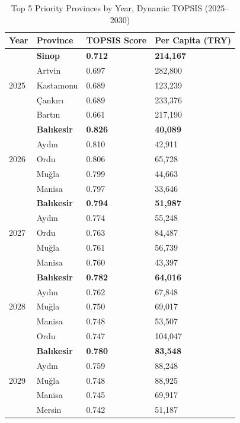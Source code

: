 \documentclass[final, 9pt, twocolumn]{saucis}
\begin{document}
\begin{table}[ht]
\centering
\caption{Top 5 Priority Provinces by Year, Dynamic TOPSIS (2025--2030)}
\label{tab:topsis_top5}
\small
\begin{threeparttable}
\begin{tabular}{p{0.6cm} p{1.5cm} p{1.7cm} p{2.2cm}}
\hline
\textbf{Year} & \textbf{Province} & \textbf{TOPSIS Score} & \textbf{Per Capita (TRY)} \\
\hline
\multirow{5}{*}{2025}
 & \textbf{Sinop} & \textbf{0.712} & \textbf{214{,}167} \\
 & Artvin    & 0.697 & 282{,}800 \\
 & Kastamonu & 0.689 & 123{,}239 \\
 & Çankırı   & 0.689 & 233{,}376 \\
 & Bartın    & 0.661 & 217{,}190 \\
\hline
\multirow{5}{*}{2026}
 & \textbf{Balıkesir} & \textbf{0.826} & \textbf{40{,}089} \\
 & Aydın     & 0.810 & 42{,}911 \\
 & Ordu      & 0.806 & 65{,}728 \\
 & Muğla     & 0.799 & 44{,}663 \\
 & Manisa    & 0.797 & 33{,}646 \\
\hline
\multirow{5}{*}{2027}
 & \textbf{Balıkesir} & \textbf{0.794} & \textbf{51{,}987} \\
 & Aydın     & 0.774 & 55{,}248 \\
 & Ordu      & 0.763 & 84{,}487 \\
 & Muğla     & 0.761 & 56{,}739 \\
 & Manisa    & 0.760 & 43{,}397 \\
\hline
\multirow{5}{*}{2028}
 & \textbf{Balıkesir} & \textbf{0.782} & \textbf{64{,}016} \\
 & Aydın     & 0.762 & 67{,}848 \\
 & Muğla     & 0.750 & 69{,}017 \\
 & Manisa    & 0.748 & 53{,}507 \\
 & Ordu      & 0.747 & 104{,}047 \\
\hline
\multirow{5}{*}{2029}
 & \textbf{Balıkesir} & \textbf{0.780} & \textbf{83{,}548} \\
 & Aydın     & 0.759 & 88{,}248 \\
 & Muğla     & 0.748 & 88{,}925 \\
 & Manisa    & 0.745 & 69{,}917 \\
 & Mersin    & 0.742 & 51{,}187 \\

\end{tabular}
\end{threeparttable}
\end{table}
\end{document}
